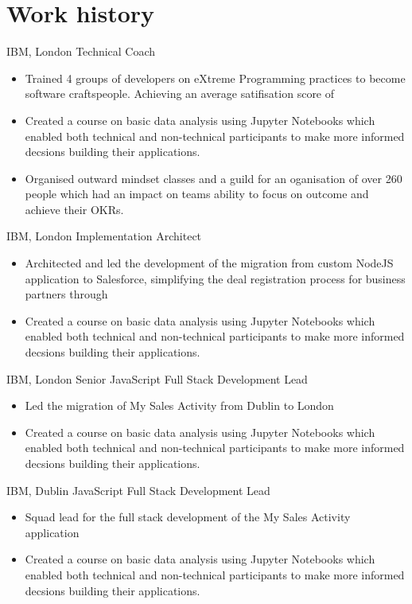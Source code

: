 \section[\faGears]{Work history}
\pubforcefullwidth
{}
{IBM, London}
{Technical Coach}
{\begin{itemize}
		\item Trained 4 groups of developers on eXtreme Programming practices to become software craftspeople. Achieving an average satifisation score of
		\item Created a course on basic data analysis using Jupyter Notebooks which enabled both technical and non-technical participants to make more informed decsions building their applications.
		\item Organised outward mindset classes and a guild for an oganisation of over 260 people which had an impact on teams ability to focus on outcome and achieve their OKRs.
	\end{itemize}}
{IBM, London}
{Implementation Architect}
{\begin{itemize}
		\item Architected and led the development of the migration from custom NodeJS application to Salesforce, simplifying the deal registration process for business partners through
		\item Created a course on basic data analysis using Jupyter Notebooks which enabled both technical and non-technical participants to make more informed decsions building their applications.
	\end{itemize}}
{IBM, London}
{Senior JavaScript Full Stack \newline
	Development Lead}
{\begin{itemize}
		\item Led the migration of My Sales Activity from Dublin to London
		\item Created a course on basic data analysis using Jupyter Notebooks which enabled both technical and non-technical participants to make more informed decsions building their applications.
	\end{itemize}}
{IBM, Dublin}
{JavaScript Full Stack Development \newline
	Lead}
{\begin{itemize}
		\item Squad lead for the full stack development of the My Sales Activity application
		\item Created a course on basic data analysis using Jupyter Notebooks which enabled both technical and non-technical participants to make more informed decsions building their applications.
	\end{itemize}}

